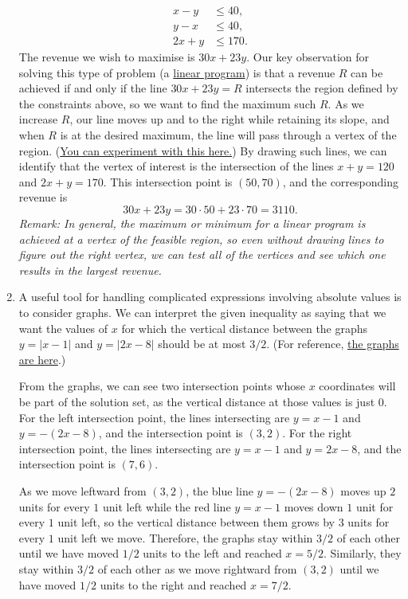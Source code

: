 \begin{enumerate}
\begin{align*}
x - y &\leq 40, \tag{cannot have too many more bowls} \\
y - x &\leq 40, \tag{cannot have too many more necklaces} \\
2x + y &\leq 170. \tag{materials allowance}
\end{align*}
The revenue we wish to maximise is $30x + 23y$. Our key observation for solving this type of problem (a \href{https://en.wikipedia.org/wiki/Linear_programming}{linear program}) is that a revenue $R$ can be achieved if and only if the line $30x + 23y = R$ intersects the region defined by the constraints above, so we want to find the maximum such $R$. As we increase $R$, our line moves up and to the right while retaining its slope, and when $R$ is at the desired maximum, the line will pass through a vertex of the region. (\href{https://www.desmos.com/calculator/d1towavtsb}{You can experiment with this here.}) By drawing such lines, we can identify that the vertex of interest is the intersection of the lines $x + y = 120$ and $2x + y = 170$. This intersection point is $(50,70)$, and the corresponding revenue is
\begin{equation*}
30x + 23y = 30\cdot 50 + 23\cdot 70 = \boxed{3110}.
\end{equation*}
\emph{Remark: In general, the maximum or minimum for a linear program is achieved at a vertex of the feasible region, so even without drawing lines to figure out the right vertex, we can test all of the vertices and see which one results in the largest revenue.}
\item A useful tool for handling complicated expressions involving absolute values is to consider graphs. We can interpret the given inequality as saying that we want the values of $x$ for which the vertical distance between the graphs $y = \lvert x - 1\rvert$ and $y = \lvert 2x - 8\rvert$ should be at most $3/2$. (For reference, \href{https://www.desmos.com/calculator/wowoxwrkea}{the graphs are here}.)\par 
From the graphs, we can see two intersection points whose $x$ coordinates will be part of the solution set, as the vertical distance at those values is just $0$. For the left intersection point, the lines intersecting are $y = x - 1$ and $y = -(2x - 8)$, and the intersection point is $(3,2)$. For the right intersection point, the lines intersecting are $y = x - 1$ and $y = 2x - 8$, and the intersection point is $(7,6)$.\par
As we move leftward from $(3,2)$, the blue line $y = -(2x - 8)$ moves up $2$ units for every $1$ unit left while the red line $y = x - 1$ moves down $1$ unit for every $1$ unit left, so the vertical distance between them grows by $3$ units for every $1$ unit left we move. Therefore, the graphs stay within $3/2$ of each other until we have moved $1/2$ units to the left and reached $x = 5/2$. Similarly, they stay within $3/2$ of each other as we move rightward from $(3,2)$ until we have moved $1/2$ units to the right and reached $x = 7/2$.\par

\end{enumerate}
